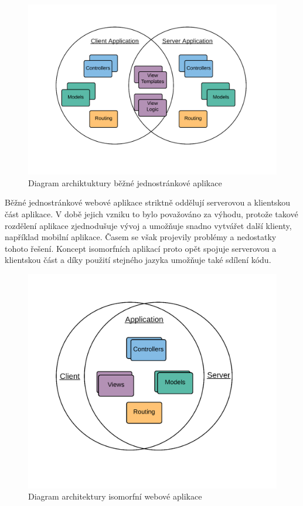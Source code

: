 \vspace{0,3cm}
\begin{figure}[h]
\begin{centering}
\includegraphics[scale=0.4]{obrazky/sharing_view}
\par\end{centering}
\caption{Diagram archiktuktury běžné jednostránkové aplikace \cite{isomorhic_book} \label{fig:spa_arch}}
\end{figure}

Běžné jednostránkové webové aplikace striktně oddělují serverovou a klientskou část aplikace. V době jejich vzniku to bylo považováno za výhodu, protože takové rozdělení aplikace zjednodušuje vývoj a umožňuje snadno vytvářet další klienty, například mobilní aplikace. Časem se však projevily problémy a nedostatky tohoto řešení. Koncept isomorfních aplikací proto opět spojuje serverovou a klientskou část a díky použití stejného jazyka umožňuje také sdílení kódu.

\begin{figure}[h]
\begin{centering}
\includegraphics[scale=0.4]{obrazky/sharing_all}
\par\end{centering}
\caption{Diagram architektury isomorfní webové aplikace \label{fig:isomorphic_arch}}
\end{figure}
\FloatBarrier

